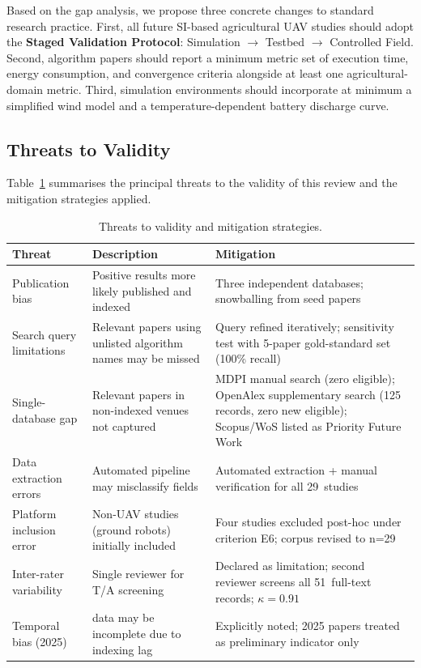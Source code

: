 \documentclass[review,3p]{elsarticle}
\begin{document}
Based on the gap analysis, we propose three concrete changes to standard research
practice. First, all future SI-based agricultural UAV studies should adopt the
\textbf{Staged Validation Protocol}: Simulation $\rightarrow$ Testbed $\rightarrow$
Controlled Field. Second, algorithm papers should report a minimum metric set
of execution time, energy consumption, and convergence criteria alongside at
least one agricultural-domain metric. Third, simulation environments should
incorporate at minimum a simplified wind model and a temperature-dependent
battery discharge curve.

\subsection{Threats to Validity}

Table~\ref{tab:threats} summarises the principal threats to the validity of
this review and the mitigation strategies applied.

\begin{table}[p]
\centering
\caption{Threats to validity and mitigation strategies.}
\label{tab:threats}
\small
\begin{tabularx}{\textwidth}{>{\raggedright\arraybackslash}p{3cm}>{\raggedright\arraybackslash}X>{\raggedright\arraybackslash}X}
\toprule
\textbf{Threat} & \textbf{Description} & \textbf{Mitigation} \\
\midrule
Publication bias & Positive results more likely published and indexed & Three independent databases; snowballing from seed papers \\[4pt]
Search query limitations & Relevant papers using unlisted algorithm names may be missed & Query refined iteratively; sensitivity test with 5-paper gold-standard set (100\% recall) \\[4pt]
Single-database gap & Relevant papers in non-indexed venues not captured & MDPI manual search (zero eligible); OpenAlex supplementary search (125 records, zero new eligible); Scopus/WoS listed as Priority Future Work \\[4pt]
Data extraction errors & Automated pipeline may misclassify fields & Automated extraction + manual verification for all 29~studies \\[4pt]
Platform inclusion error & Non-UAV studies (ground robots) initially included & Four studies excluded post-hoc under criterion E6; corpus revised to n=29 \\[4pt]
Inter-rater variability & Single reviewer for T/A screening & Declared as limitation; second reviewer screens all 51~full-text records; $\kappa=0.91$ \\[4pt]
Temporal bias (2025) & 2025 data may be incomplete due to indexing lag & Explicitly noted; 2025 papers treated as preliminary indicator only \\
\bottomrule
\end{tabularx}
\end{table}
\end{document}
